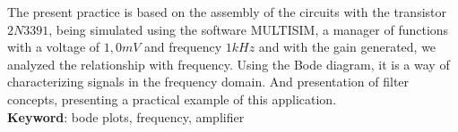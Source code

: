  \setlength{\absparsep}{18pt} %
\begin{resumo}[Abstract]
The present practice is based on the assembly of the circuits with the transistor $ 2N3391 $, being simulated using the software MULTISIM, a manager of functions with a voltage of $ 1,0mV $ and frequency $ 1 kHz $ and with the gain generated, we analyzed the relationship with frequency. Using the Bode diagram, it is a way of characterizing signals in the frequency domain. And presentation of filter concepts, presenting a practical example of this application.\\
\noindent
\textbf{Keyword}: bode plots, frequency, amplifier
\end{resumo} 
